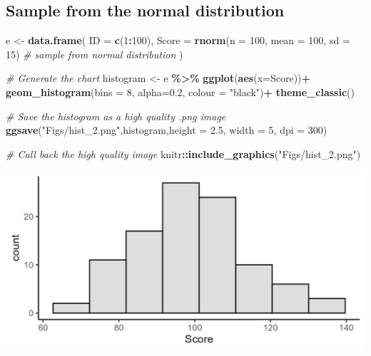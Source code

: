 \documentclass[
]{book}
\newenvironment{Shaded}{\begin{snugshade}}{\end{snugshade}}
\newcommand{\AttributeTok}[1]{\textcolor[rgb]{0.13,0.29,0.53}{#1}}
\newcommand{\CommentTok}[1]{\textcolor[rgb]{0.56,0.35,0.01}{\textit{#1}}}
\newcommand{\DecValTok}[1]{\textcolor[rgb]{0.00,0.00,0.81}{#1}}
\newcommand{\FloatTok}[1]{\textcolor[rgb]{0.00,0.00,0.81}{#1}}
\newcommand{\FunctionTok}[1]{\textcolor[rgb]{0.13,0.29,0.53}{\textbf{#1}}}
\newcommand{\NormalTok}[1]{#1}
\newcommand{\OtherTok}[1]{\textcolor[rgb]{0.56,0.35,0.01}{#1}}
\newcommand{\SpecialCharTok}[1]{\textcolor[rgb]{0.81,0.36,0.00}{\textbf{#1}}}
\newcommand{\StringTok}[1]{\textcolor[rgb]{0.31,0.60,0.02}{#1}}
\begin{document}
\subsection*{Sample from the normal distribution}\label{sample-from-the-normal-distribution}

\begin{Shaded}
\begin{Highlighting}[]
\NormalTok{e }\OtherTok{\textless{}{-}} \FunctionTok{data.frame}\NormalTok{(}
  \AttributeTok{ID =} \FunctionTok{c}\NormalTok{(}\DecValTok{1}\SpecialCharTok{:}\DecValTok{100}\NormalTok{),}
  \AttributeTok{Score =} \FunctionTok{rnorm}\NormalTok{(}\AttributeTok{n =} \DecValTok{100}\NormalTok{, }\AttributeTok{mean =} \DecValTok{100}\NormalTok{, }\AttributeTok{sd =} \DecValTok{15}\NormalTok{) }\CommentTok{\# sample from normal distribution}
\NormalTok{)}

\CommentTok{\# Generate the chart}
\NormalTok{histogram }\OtherTok{\textless{}{-}}\NormalTok{ e }\SpecialCharTok{\%\textgreater{}\%}
  \FunctionTok{ggplot}\NormalTok{(}\FunctionTok{aes}\NormalTok{(}\AttributeTok{x=}\NormalTok{Score))}\SpecialCharTok{+}
  \FunctionTok{geom\_histogram}\NormalTok{(}\AttributeTok{bins =} \DecValTok{8}\NormalTok{, }\AttributeTok{alpha=}\FloatTok{0.2}\NormalTok{, }\AttributeTok{colour =} \StringTok{"black"}\NormalTok{)}\SpecialCharTok{+}
  \FunctionTok{theme\_classic}\NormalTok{()}

\CommentTok{\# Save the histogram as a high quality .png image}
\FunctionTok{ggsave}\NormalTok{(}\StringTok{"Figs/hist\_2.png"}\NormalTok{,histogram,}\AttributeTok{height =} \FloatTok{2.5}\NormalTok{, }\AttributeTok{width =} \DecValTok{5}\NormalTok{, }\AttributeTok{dpi =} \DecValTok{300}\NormalTok{)}

\CommentTok{\# Call back the high quality image }
\NormalTok{knitr}\SpecialCharTok{::}\FunctionTok{include\_graphics}\NormalTok{(}\StringTok{"Figs/hist\_2.png"}\NormalTok{)}
\end{Highlighting}
\end{Shaded}

\includegraphics[width=20.83in]{Figs/hist_2}
\end{document}
